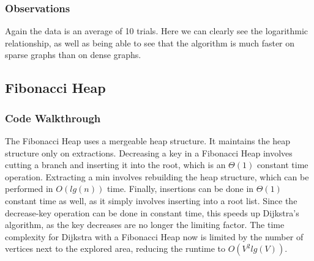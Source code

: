 \documentclass[a4paper,12pt]{article}
\begin{document}
\subsubsection{Observations}
Again the data is an average of 10 trials. Here we can clearly see the logarithmic relationship, as well as being able to see that the algorithm is much faster on sparse graphs than on dense graphs.
\subsection{Fibonacci Heap}
\subsubsection{Code Walkthrough}

The Fibonacci Heap uses a mergeable heap structure. It maintains the heap structure only on extractions. Decreasing a key in a Fibonacci Heap involves cutting a branch and inserting it into the root, which is an $\Theta(1)$ constant time operation. Extracting a min involves rebuilding the heap structure, which can be performed in $O(lg(n))$ time. Finally, insertions can be done in $\Theta(1)$ constant time as well, as it simply involves inserting into a root list. Since the decrease-key operation can be done in constant time, this speeds up Dijkstra's algorithm, as the key decreases are no longer the limiting factor. The time complexity for Dijkstra with a Fibonacci Heap now is limited by the number of vertices next to the explored area, reducing the runtime to $O(V^2lg(V))$.
\end{document}
